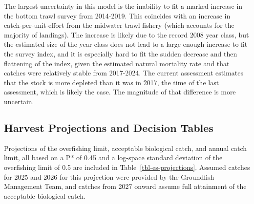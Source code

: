 \documentclass[
]{scrartcl}
\begin{document}
The largest uncertainty in this model is the inability to fit a marked
increase in the bottom trawl survey from 2014-2019. This coincides with
an increase in catch-per-unit-effort from the midwater trawl fishery
(which accounts for the majority of landings). The increase is likely
due to the record 2008 year class, but the estimated size of the year
class does not lead to a large enough increase to fit the survey index,
and it is especially hard to fit the sudden decrease and then flattening
of the index, given the estimated natural mortality rate and that
catches were relatively stable from 2017-2024. The current assessment
estimates that the stock is more depleted than it was in 2017, the time
of the last assessment, which is likely the case. The magnitude of that
difference is more uncertain.

\subsection{Harvest Projections and Decision
Tables}\label{harvest-projections-and-decision-tables}

Projections of the overfishing limit, acceptable biological catch, and
annual catch limit, all based on a P* of 0.45 and a log-space standard
deviation of the overfishing limit of 0.5 are included in
Table~\ref{tbl-es-projections}. Assumed catches for 2025 and 2026 for
this projection were provided by the Groundfish Management Team, and
catches from 2027 onward assume full attainment of the acceptable
biological catch.

\begingroup
\fontsize{9.0pt}{10.8pt}\selectfont
\end{document}
